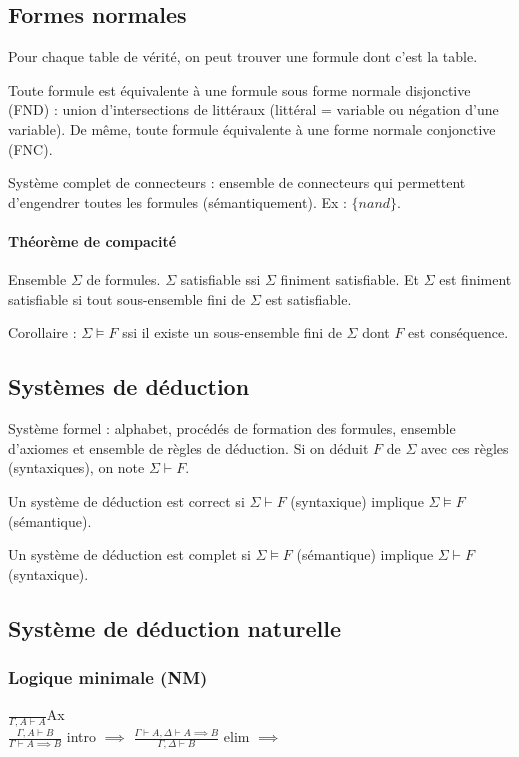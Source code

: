 \documentclass[french]{article}
\begin{document}
\subsection{Formes normales}
Pour chaque table de vérité, on peut trouver une formule dont c'est la table.

Toute formule est équivalente à une formule sous forme normale disjonctive (FND) : union d'intersections de littéraux (littéral = variable ou négation d'une variable). De même, toute formule équivalente à une forme normale conjonctive (FNC).

Système complet de connecteurs : ensemble de connecteurs qui permettent d'engendrer toutes les formules (sémantiquement). Ex : $\{nand\}$.

\paragraph{Théorème de compacité}
Ensemble $\Sigma$ de formules. $\Sigma$ satisfiable ssi $\Sigma$ finiment satisfiable. Et $\Sigma$ est finiment satisfiable si tout sous-ensemble fini de $\Sigma$ est satisfiable.

Corollaire : $\Sigma\models F$ ssi il existe un sous-ensemble fini de $\Sigma$ dont $F$ est conséquence.

\subsection{Systèmes de déduction}
Système formel : alphabet, procédés de formation des formules, ensemble d'axiomes et ensemble de règles de déduction. Si on déduit $F$ de $\Sigma$ avec ces règles (syntaxiques), on note $\Sigma\vdash F$.

Un système de déduction est correct si $\Sigma\vdash F$ (syntaxique) implique $\Sigma\models F$ (sémantique).

Un système de déduction est complet si  $\Sigma\models F$ (sémantique) implique  $\Sigma\vdash F$ (syntaxique).

\subsection{Système de déduction naturelle}
\subsubsection{Logique minimale (NM)}
$\frac{}{\Gamma,A\vdash A}$Ax\\

$\frac{\Gamma ,A\vdash B}{\Gamma\vdash A\implies B}$ intro $\implies$ 
$\frac{\Gamma\vdash A, \Delta\vdash A\implies B}{\Gamma ,\Delta\vdash B}$ elim $\implies$\\
\end{document}
